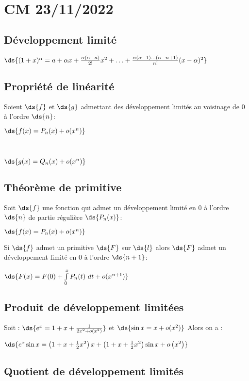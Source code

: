 \documentclass[11pt]{book}
\begin{document}
	

	\section{CM 23/11/2022}

	\subsection{Développement limité }

 	$\ds{(1+x)^\alpha = a+\alpha x+\frac{\alpha (\alpha -a)}{2!}x^2+\ldots+\frac{\alpha (\alpha -1)\ldots(\alpha -n+1)}{n!}(x-\alpha )^2}$

	\subsection{Propriété de linéarité}

	Soient $\ds {f}$ et $\ds{g}$ admettant des développement limités au voisinage de 0 à l'ordre $\ds{n}$: \\
	\centerline{$\ds{f(x)=P_n(x)+o(x^n)}$} \\
	\centerline{$\ds{g(x)=Q_n(x)+o(x^n)}$}


	\subsection{Théorème de primitive}

	Soit $\ds{f}$ une fonction qui admet un développement limité en 0 à l'ordre $\ds{n}$ de partie régulière $\ds{P_n(x)}$:  \\
	\centerline{$\ds{f(x)=P_n(x)+o(x^n)}$}
	Si $\ds{f}$ admet un primitive $\ds{F}$ sur $\ds{l}$ alors $\ds{F}$ admet un développement limité en 0 à l'ordre $\ds{n+1}$: \\
	\centerline{$\ds{F(x)=F(0)+\int\limits_{0}^{x} P_n(t) \  d t +o(x^{n+1}) }$}

	\subsection{Produit de développement limitées}	

	Soit :
	$\ds{e^x=1+x+\frac{1}{2x^2+o\left(x^2  \right) }}$ et $\ds{\sin x= x+o(x^2)}$ 
	Alors on a : \\
	\centerline{$\ds{e^x \sin x= \left( 1+x+\frac{1}{2}x^2 \right)x  + \left( 1+x+\frac{1}{2}x^2 \right) \sin x +o\left(x^2  \right) }$}

	\subsection{Quotient de développement limités}
\end{document}
